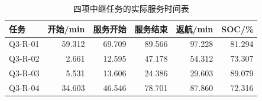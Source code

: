 \begin{table}[htbp]\centering\small
\caption{四项中继任务的实际服务时间表}\label{tab:q3_relays}
\begin{tabular}{@{}lrrrrr@{}}
\toprule
任务 & 开始/min & 服务开始 & 服务结束 & 返航/min & SOC/\%\\
\midrule
Q3-R-01 & 59.312 & 69.709 & 89.566 & 97.228 & 81.294\\
Q3-R-02 & 2.661 & 12.595 & 47.178 & 54.312 & 73.307\\
Q3-R-03 & 5.531 & 13.606 & 24.386 & 29.603 & 89.079\\
Q3-R-04 & 34.603 & 46.546 & 78.701 & 87.860 & 72.316\\
\bottomrule
\end{tabular}
\end{table}
